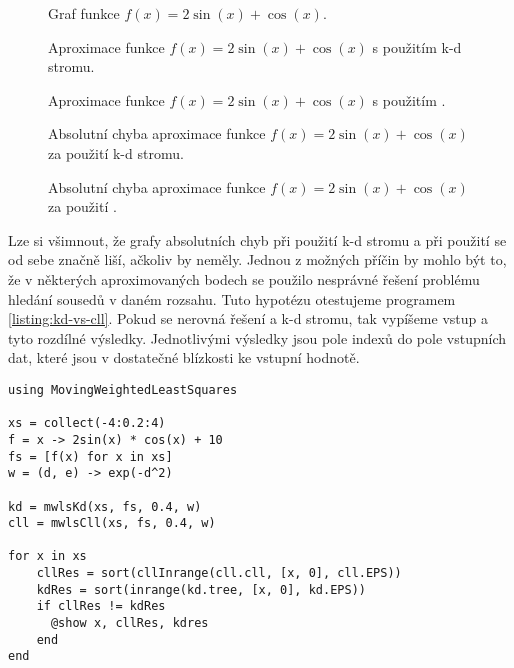 \begin{figure}[!ht]
  \centering
  \caption{Graf funkce $f(x) = 2\sin(x) + \cos(x)$.}
  \label{fig:1d-to-1d:function-values}
\end{figure}

\begin{figure}[!ht]
  \centering
  \caption{Aproximace funkce $f(x) = 2\sin(x) + \cos(x)$ s použitím k-d stromu.}
  \label{fig:1d-to-1d:kd-tree-approximation}
\end{figure}

\begin{figure}[!ht]
  \centering
  \caption{Aproximace funkce $f(x) = 2\sin(x) + \cos(x)$ s použitím .}
  \label{fig:1d-to-1d:cll-approximation}
\end{figure}

\begin{figure}[!ht]
  \centering
  \caption{Absolutní chyba aproximace funkce $f(x) = 2\sin(x) + \cos(x)$ za použití k-d stromu.}
  \label{fig:1d-to-1d:kd-aerr}
\end{figure}

\begin{figure}[!ht]
  \centering
  \caption{Absolutní chyba aproximace funkce $f(x) = 2\sin(x) + \cos(x)$ za použití .}
  \label{fig:1d-to-1d:cll-aerr}
\end{figure}

Lze si všimnout, že grafy absolutních chyb při použití k-d stromu a při použití  se od sebe značně liší, ačkoliv by neměly. Jednou z možných příčin by mohlo být to, že v některých aproximovaných bodech se použilo nesprávné řešení problému hledání sousedů v daném rozsahu. Tuto hypotézu otestujeme programem \ref{listing:kd-vs-cll}. Pokud se nerovná řešení  a k-d stromu, tak vypíšeme vstup a tyto rozdílné výsledky. Jednotlivými výsledky jsou pole indexů do pole vstupních dat, které jsou v dostatečné blízkosti ke vstupní hodnotě.

\begin{lstlisting}[caption={Srovnání řešení k-d stromu a cell linked listu}, label={listing:kd-vs-cll}]
using MovingWeightedLeastSquares

xs = collect(-4:0.2:4)
f = x -> 2sin(x) * cos(x) + 10
fs = [f(x) for x in xs]
w = (d, e) -> exp(-d^2)

kd = mwlsKd(xs, fs, 0.4, w)
cll = mwlsCll(xs, fs, 0.4, w)

for x in xs
    cllRes = sort(cllInrange(cll.cll, [x, 0], cll.EPS))
    kdRes = sort(inrange(kd.tree, [x, 0], kd.EPS))
    if cllRes != kdRes
      @show x, cllRes, kdres
    end
end
\end{lstlisting}

